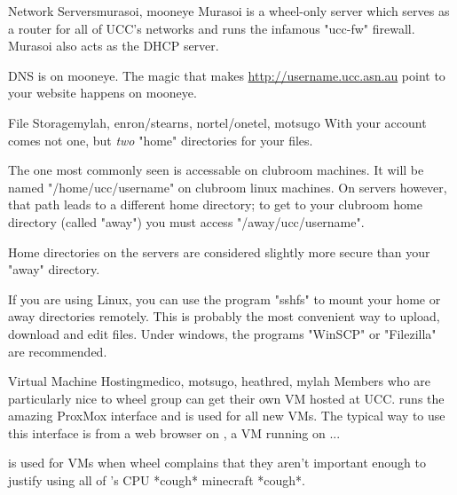 \begin{uccservice}{Network Servers}{murasoi, mooneye}
Murasoi is a wheel-only server which serves as a router for all of UCC's networks and runs the infamous "ucc-fw" firewall. Murasoi also acts as the DHCP server.

DNS is on mooneye. The magic that makes \url{http://username.ucc.asn.au} point to your website happens on mooneye.
\end{uccservice}

\begin{uccservice}{File Storage}{mylah, enron/stearns, nortel/onetel, motsugo}
With your account comes not one, but \emph{two} "home" directories for your files.

The one most commonly seen is accessable on clubroom machines. It will be named "/home/ucc/username" on clubroom linux machines. On servers however, that path leads to a different home directory; to get to your clubroom home directory (called "away") you must access "/away/ucc/username".

Home directories on the servers are considered slightly more secure than your "away" directory. 

If you are using Linux, you can use the program "sshfs" to mount your home or away directories remotely. This is probably the most convenient way to upload, download and edit files. Under windows, the programs "WinSCP" or "Filezilla" are recommended.

\end{uccservice}

\begin{uccservice}{Virtual Machine Hosting}{medico, motsugo, heathred, mylah}
Members who are particularly nice to wheel group can get their own VM hosted at UCC.  runs the amazing ProxMox interface and is used for all new VMs. The typical way to use this interface is from a web browser on , a VM running on ...

 is used for VMs when wheel complains that they aren't important enough to justify using all of 's CPU *cough* minecraft *cough*.
\end{uccservice}

